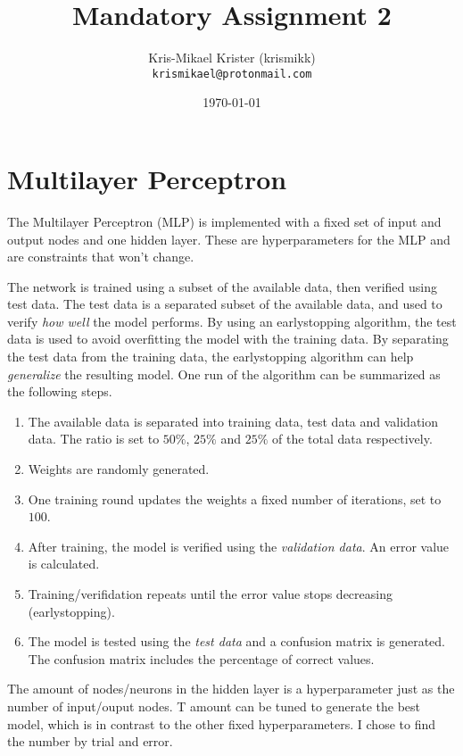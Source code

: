 \documentclass{article}
\title{Mandatory Assignment 2}
\author{Kris-Mikael Krister (krismikk)\\\texttt{krismikael@protonmail.com}}
\date{\today}
\begin{document}
\maketitle

\section*{Multilayer Perceptron}

The Multilayer Perceptron (MLP) is implemented with a fixed set of input and output nodes and one hidden layer. These are hyperparameters for the MLP and are constraints that won't change.

The network is trained using a subset of the available data, then verified using test data. The test data is a separated subset of the available data, and used to verify \emph{how well} the model performs. By using an earlystopping algorithm, the test data is used to avoid overfitting the model with the training data. By separating the test data from the training data, the earlystopping algorithm can help \emph{generalize} the resulting model. One run of the algorithm can be summarized as the following steps.

\begin{enumerate}
    \item The available data is separated into training data, test data and validation data. The ratio is set to $50\%$, $25\%$ and $25\%$ of the total data respectively.
    \item Weights are randomly generated.
    \item One training round updates the weights a fixed number of iterations, set to $100$.
    \item After training, the model is verified using the \emph{validation data}. An error value is calculated.
    \item Training/verifidation repeats until the error value stops decreasing (earlystopping).
    \item The model is tested using the \emph{test data} and a confusion matrix is generated. The confusion matrix includes the percentage of correct values.
\end{enumerate}

\noindent The amount of nodes/neurons in the hidden layer is a hyperparameter just as the number of input/ouput nodes. T amount can be tuned to generate the best model, which is in contrast to the other fixed hyperparameters. I chose to find the number by trial and error.
\end{document}

